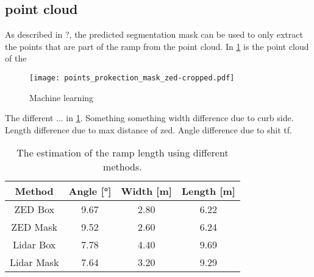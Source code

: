 \subsection{point cloud}
As described in ?, the predicted segmentation mask can be used to only extract the points that are part of the ramp from the point cloud.
In \cref{fig:points_prokection_mask} is the point cloud of the
\begin{figure}[htb]
	\centering
	\texttt{[image: points\_prokection\_mask\_zed-cropped.pdf]}
	\caption{Machine learning}
	\label{fig:points_prokection_mask}
\end{figure}
The different ... in \cref{tab:cloud_extraction_estimation}.
Something something width difference due to curb side. Length difference due to max distance of zed. Angle difference due to shit tf.
\begin{table}[htb]
	\centering
	\caption[Ramp length]{The estimation of the ramp length using different methods.}
	\label{tab:cloud_extraction_estimation}
	\begin{tabular}[t]{cccc}
		\toprule
		\textbf{Method} & \textbf{Angle} [\si{\degree}] & \textbf{Width} [\si{\metre}] & \textbf{Length} [\si{\metre}] \\
		\midrule
		ZED Box         & \SI{9.67}{}                   & \SI{2.80}{}                  & \SI{6.22}[]{}                 \\
		ZED Mask        & \SI{9.52}{}                   & \SI{2.60}{}                  & \SI{6.24}[]{}                 \\
		Lidar Box       & \SI{7.78}{}                   & \SI{4.40}{}                  & \SI{9.69}[]{}                 \\
		Lidar Mask      & \SI{7.64}{}                   & \SI{3.20}{}                  & \SI{9.29}[]{}                 \\
		\bottomrule
	\end{tabular}
\end{table}